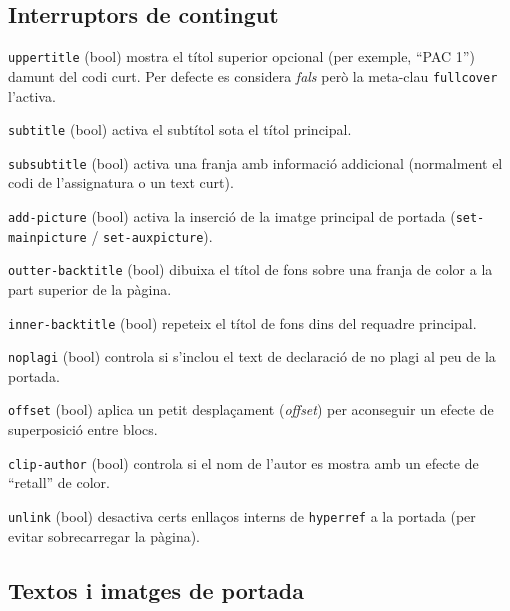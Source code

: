 \documentclass[11pt,a4paper]{article}
\begin{document}
\subsection*{Interruptors de contingut}

\begin{description}
  \item{\verb|uppertitle| (bool)} mostra el títol superior opcional
    (per exemple, ``PAC 1'') damunt del codi curt. Per defecte es
    considera \emph{fals} però la meta-clau \verb|fullcover| l'activa.
  \item{\verb|subtitle| (bool)} activa el subtítol sota el títol
    principal.
  \item{\verb|subsubtitle| (bool)} activa una franja amb informació
    addicional (normalment el codi de l'assignatura o un text curt).
  \item{\verb|add-picture| (bool)} activa la inserció de la imatge
    principal de portada (\verb|set-mainpicture| / \verb|set-auxpicture|).
  \item{\verb|outter-backtitle| (bool)} dibuixa el títol de fons sobre
    una franja de color a la part superior de la pàgina.
  \item{\verb|inner-backtitle| (bool)} repeteix el títol de fons dins
    del requadre principal.
  \item{\verb|noplagi| (bool)} controla si s'inclou el text de
    declaració de no plagi al peu de la portada.
  \item{\verb|offset| (bool)} aplica un petit desplaçament (\emph{offset})
    per aconseguir un efecte de superposició entre blocs.
  \item{\verb|clip-author| (bool)} controla si el nom de l'autor es
    mostra amb un efecte de ``retall'' de color.
  \item{\verb|unlink| (bool)} desactiva certs enllaços interns de
    \texttt{hyperref} a la portada (per evitar sobrecarregar la
    pàgina).
\end{description}

\subsection*{Textos i imatges de portada}
\end{document}
